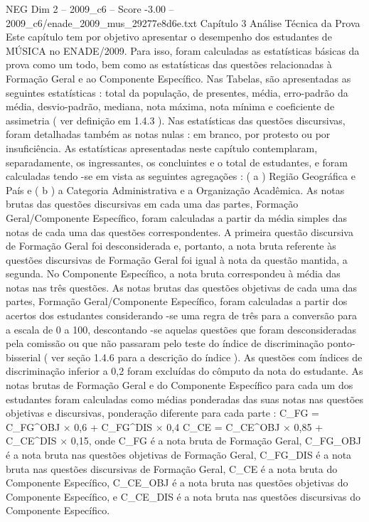 \begin{textsample}{NEG Dim 2 – 2009\_c6 – Score -3.00 – 2009\_c6/enade\_2009\_mus\_29277e8d6e.txt}  \label{ex:f2_neg_131}
Capítulo 3 Análise Técnica da Prova Este capítulo tem por objetivo apresentar o desempenho dos estudantes de MÚSICA no ENADE/2009.
Para isso, foram calculadas as estatísticas básicas da prova como um todo, bem como as estatísticas das questões relacionadas à Formação Geral e ao Componente Específico.
Nas Tabelas, são apresentadas as seguintes estatísticas : total da população, de presentes, média, erro-padrão da média, desvio-padrão, mediana, nota máxima, nota mínima e coeficiente de assimetria ( ver definição em 1.4.3 ).
Nas estatísticas das questões discursivas, foram detalhadas também as notas nulas : em branco, por protesto ou por insuficiência.
As estatísticas apresentadas neste capítulo contemplaram, separadamente, os ingressantes, os concluintes e o total de estudantes, e foram calculadas tendo -se em vista as seguintes agregações : ( a ) Região Geográfica e País e ( b ) a Categoria Administrativa e a Organização Acadêmica.
As notas brutas das questões discursivas em cada uma das partes, Formação Geral/Componente Específico, foram calculadas a partir da média simples das notas de cada uma das questões correspondentes.
A primeira questão discursiva de Formação Geral foi desconsiderada e, portanto, a nota bruta referente às questões discursivas de Formação Geral foi igual à nota da questão mantida, a segunda.
No Componente Específico, a nota bruta correspondeu à média das notas nas três questões.
As notas brutas das questões objetivas de cada uma das partes, Formação Geral/Componente Específico, foram calculadas a partir dos acertos dos estudantes considerando -se uma regra de três para a conversão para a escala de 0 a 100, descontando -se aquelas questões que foram desconsideradas pela comissão ou que não passaram pelo teste do índice de discriminação ponto-bisserial ( ver seção 1.4.6 para a descrição do índice ).
As questões com índices de discriminação inferior a 0,2 foram excluídas do cômputo da nota do estudante.
As notas brutas de Formação Geral e do Componente Específico para cada um dos estudantes foram calculadas como médias ponderadas das suas notas nas questões objetivas e discursivas, ponderação diferente para cada parte : C\_FG = C\_FG\textasciicircum{}OBJ × 0,6 + C\_FG\textasciicircum{}DIS × 0,4 C\_CE = C\_CE\textasciicircum{}OBJ × 0,85 + C\_CE\textasciicircum{}DIS × 0,15, onde C\_FG é a nota bruta de Formação Geral, C\_FG\_OBJ é a nota bruta nas questões objetivas de Formação Geral, C\_FG\_DIS é a nota bruta nas questões discursivas de Formação Geral, C\_CE é a nota bruta do Componente Específico, C\_CE\_OBJ é a nota bruta nas questões objetivas do Componente Específico, e C\_CE\_DIS é a nota bruta nas questões discursivas do Componente Específico.

\end{textsample}
